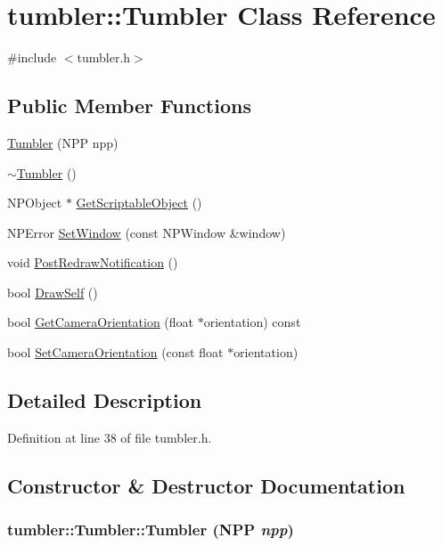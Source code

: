 \hypertarget{classtumbler_1_1_tumbler}{
\section{tumbler::Tumbler Class Reference}
\label{classtumbler_1_1_tumbler}
}


{\ttfamily \#include $<$tumbler.h$>$}

\subsection*{Public Member Functions}
\begin{DoxyCompactItemize}
\item 
\hyperlink{classtumbler_1_1_tumbler_a4f5dd0baa068ccb8214b0e477f7cd94b}{Tumbler} (NPP npp)
\item 
\hyperlink{classtumbler_1_1_tumbler_a80349e180aa825c15d63bada00c6e9a8}{$\sim$Tumbler} ()
\item 
NPObject $\ast$ \hyperlink{classtumbler_1_1_tumbler_ad438453c62d1edcbdd5cb39a38143a0b}{GetScriptableObject} ()
\item 
NPError \hyperlink{classtumbler_1_1_tumbler_a6aba2f3cfa10be35c0a789924343b1b0}{SetWindow} (const NPWindow \&window)
\item 
void \hyperlink{classtumbler_1_1_tumbler_ab721f5f95ce020ce6680033771ed4577}{PostRedrawNotification} ()
\item 
bool \hyperlink{classtumbler_1_1_tumbler_a8da0b0b0e85708487c55f6ca5c999da1}{DrawSelf} ()
\item 
bool \hyperlink{classtumbler_1_1_tumbler_a5e01d6cde9baab4e5c2aa4b834733bf2}{GetCameraOrientation} (float $\ast$orientation) const 
\item 
bool \hyperlink{classtumbler_1_1_tumbler_a2657d32f15492fc56406d1750172ca8c}{SetCameraOrientation} (const float $\ast$orientation)
\end{DoxyCompactItemize}


\subsection{Detailed Description}


Definition at line 38 of file tumbler.h.



\subsection{Constructor \& Destructor Documentation}
\hypertarget{classtumbler_1_1_tumbler_a4f5dd0baa068ccb8214b0e477f7cd94b}{
\subsubsection[{Tumbler}]{\setlength{\rightskip}{0pt plus 5cm}tumbler::Tumbler::Tumbler (NPP {\em npp})}}
\label{classtumbler_1_1_tumbler_a4f5dd0baa068ccb8214b0e477f7cd94b}


